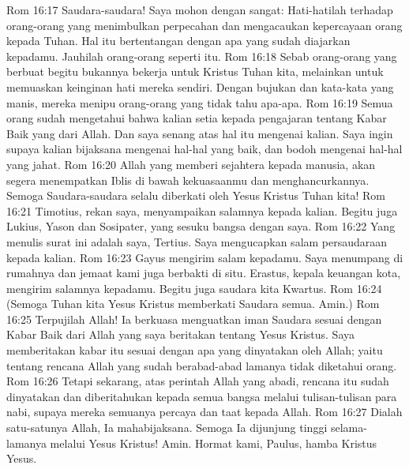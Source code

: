 Rom 16:17  Saudara-saudara! Saya mohon dengan sangat: Hati-hatilah terhadap orang-orang yang menimbulkan perpecahan dan mengacaukan kepercayaan orang kepada Tuhan. Hal itu bertentangan dengan apa yang sudah diajarkan kepadamu. Jauhilah orang-orang seperti itu.
Rom 16:18  Sebab orang-orang yang berbuat begitu bukannya bekerja untuk Kristus Tuhan kita, melainkan untuk memuaskan keinginan hati mereka sendiri. Dengan bujukan dan kata-kata yang manis, mereka menipu orang-orang yang tidak tahu apa-apa.
Rom 16:19  Semua orang sudah mengetahui bahwa kalian setia kepada pengajaran tentang Kabar Baik yang dari Allah. Dan saya senang atas hal itu mengenai kalian. Saya ingin supaya kalian bijaksana mengenai hal-hal yang baik, dan bodoh mengenai hal-hal yang jahat.
Rom 16:20  Allah yang memberi sejahtera kepada manusia, akan segera menempatkan Iblis di bawah kekuasaanmu dan menghancurkannya. Semoga Saudara-saudara selalu diberkati oleh Yesus Kristus Tuhan kita!
Rom 16:21  Timotius, rekan saya, menyampaikan salamnya kepada kalian. Begitu juga Lukius, Yason dan Sosipater, yang sesuku bangsa dengan saya.
Rom 16:22  Yang menulis surat ini adalah saya, Tertius. Saya mengucapkan salam persaudaraan kepada kalian.
Rom 16:23  Gayus mengirim salam kepadamu. Saya menumpang di rumahnya dan jemaat kami juga berbakti di situ. Erastus, kepala keuangan kota, mengirim salamnya kepadamu. Begitu juga saudara kita Kwartus.
Rom 16:24  (Semoga Tuhan kita Yesus Kristus memberkati Saudara semua. Amin.)
Rom 16:25  Terpujilah Allah! Ia berkuasa menguatkan iman Saudara sesuai dengan Kabar Baik dari Allah yang saya beritakan tentang Yesus Kristus. Saya memberitakan kabar itu sesuai dengan apa yang dinyatakan oleh Allah; yaitu tentang rencana Allah yang sudah berabad-abad lamanya tidak diketahui orang.
Rom 16:26  Tetapi sekarang, atas perintah Allah yang abadi, rencana itu sudah dinyatakan dan diberitahukan kepada semua bangsa melalui tulisan-tulisan para nabi, supaya mereka semuanya percaya dan taat kepada Allah.
Rom 16:27  Dialah satu-satunya Allah, Ia mahabijaksana. Semoga Ia dijunjung tinggi selama-lamanya melalui Yesus Kristus! Amin. Hormat kami, Paulus, hamba Kristus Yesus.


